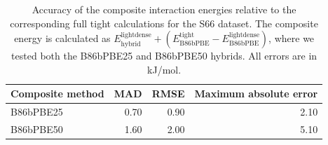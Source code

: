 \begin{table}[h]

\caption{\label{tab:s66_composite_basis_errors}Accuracy of the composite interaction energies relative to the corresponding full tight calculations for the S66 dataset. The composite energy is calculated as $E_{\mathrm{hybrid}}^{\mathrm{lightdense}} + \left(E_{\mathrm{B86bPBE}}^{\mathrm{tight}} - E_{\mathrm{B86bPBE}}^{\mathrm{lightdense}}\right)$, where we tested both the B86bPBE25 and B86bPBE50 hybrids. All errors are in kJ/mol.}
\begin{tabular}{lrrr}
\toprule
Composite method & MAD & RMSE & Maximum absolute error \\ 
\midrule
B86bPBE25 & 0.70 & 0.90 & 2.10 \\
B86bPBE50 & 1.60 & 2.00 & 5.10 \\
\bottomrule
\end{tabular}

\end{table}